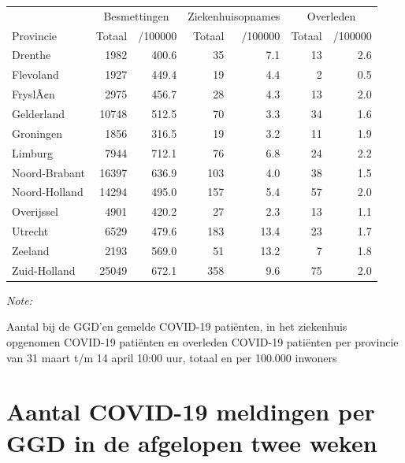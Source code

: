 \documentclass[
  english,
  man,floatsintext]{apa6}
\begin{document}
\begin{table}
\centering
\begin{threeparttable}
\begin{tabular}{lrrrrrr}
\toprule
\multicolumn{1}{c}{ } & \multicolumn{2}{c}{Besmettingen} & \multicolumn{2}{c}{Ziekenhuisopnames} & \multicolumn{2}{c}{Overleden} \\
\cmidrule(l{3pt}r{3pt}){2-3} \cmidrule(l{3pt}r{3pt}){4-5} \cmidrule(l{3pt}r{3pt}){6-7}
Provincie & Totaal & /100000 & Totaal & /100000 & Totaal & /100000\\
\midrule
Drenthe & 1982 & 400.6 & 35 & 7.1 & 13 & 2.6\\
Flevoland & 1927 & 449.4 & 19 & 4.4 & 2 & 0.5\\
FryslÃ¢n & 2975 & 456.7 & 28 & 4.3 & 13 & 2.0\\
Gelderland & 10748 & 512.5 & 70 & 3.3 & 34 & 1.6\\
Groningen & 1856 & 316.5 & 19 & 3.2 & 11 & 1.9\\
Limburg & 7944 & 712.1 & 76 & 6.8 & 24 & 2.2\\
Noord-Brabant & 16397 & 636.9 & 103 & 4.0 & 38 & 1.5\\
Noord-Holland & 14294 & 495.0 & 157 & 5.4 & 57 & 2.0\\
Overijssel & 4901 & 420.2 & 27 & 2.3 & 13 & 1.1\\
Utrecht & 6529 & 479.6 & 183 & 13.4 & 23 & 1.7\\
Zeeland & 2193 & 569.0 & 51 & 13.2 & 7 & 1.8\\
Zuid-Holland & 25049 & 672.1 & 358 & 9.6 & 75 & 2.0\\
\bottomrule
\end{tabular}
\begin{tablenotes}
\item \textit{Note: } 
\item Aantal bij de GGD’en gemelde COVID-19 patiënten, in het ziekenhuis opgenomen COVID-19 patiënten en overleden COVID-19 patiënten per provincie van 31 maart t/m 14 april 10:00 uur, totaal en per 100.000 inwoners
\end{tablenotes}
\end{threeparttable}
\end{table}

\newpage

\hypertarget{aantal-covid-19-meldingen-per-ggd-in-de-afgelopen-twee-weken}{%
\section{Aantal COVID-19 meldingen per GGD in de afgelopen twee weken}\label{aantal-covid-19-meldingen-per-ggd-in-de-afgelopen-twee-weken}}
\end{document}
